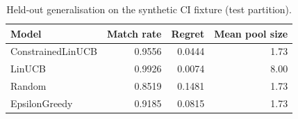 \begin{table}[h]
\centering
\caption{Held-out generalisation on the synthetic CI fixture (test partition).}
\label{tab:results}
\begin{tabular}{lrrr}
\toprule
Model & Match rate & Regret & Mean pool size \\
\midrule
ConstrainedLinUCB & 0.9556 & 0.0444 & 1.73 \\
LinUCB            & 0.9926 & 0.0074 & 8.00 \\
Random            & 0.8519 & 0.1481 & 1.73 \\
EpsilonGreedy      & 0.9185 & 0.0815 & 1.73 \\
\bottomrule
\end{tabular}
\end{table}
